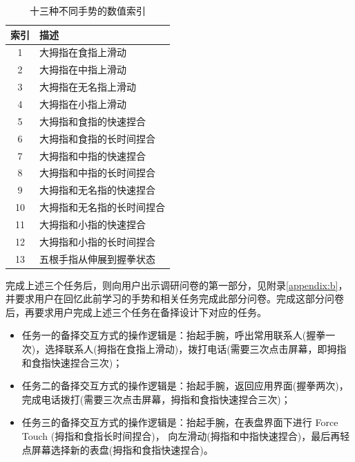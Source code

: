 \begin{table}[H]
    \small
    \kaishu
    \centering
    \begin{tabular}{c l}
        \toprule
        \textbf{索引}        & \textbf{描述} \\
        \hline
        1     & 大拇指在食指上滑动 \\
        2     & 大拇指在中指上滑动 \\
        3     & 大拇指在无名指上滑动 \\
        4     & 大拇指在小指上滑动 \\
        5     & 大拇指和食指的快速捏合 \\
        6     & 大拇指和食指的长时间捏合 \\
        7     & 大拇指和中指的快速捏合 \\
        8     & 大拇指和中指的长时间捏合  \\
        9     & 大拇指和无名指的快速捏合  \\
        10    & 大拇指和无名指的长时间捏合 \\
        11    & 大拇指和小指的快速捏合 \\
        12    & 大拇指和小指的长时间捏合 \\
        13    & 五根手指从伸展到握拳状态 \\
        \bottomrule
    \end{tabular}
    \caption{十三种不同手势的数值索引}
    \label{table:gesture}
\end{table}

完成上述三个任务后，则向用户出示调研问卷的第一部分，见附录\ref{appendix:b}，并要求用户在回忆此前学习的手势和相关任务完成此部分问卷。完成这部分问卷后，再要求用户完成上述三个任务在备择设计下对应的任务。

\begin{itemize}
    \kaishu
    \item 任务一的备择交互方式的操作逻辑是：抬起手腕，呼出常用联系人(握拳一次)，选择联系人(拇指在食指上滑动)，拨打电话(需要三次点击屏幕，即拇指和食指快速捏合三次)；
    \item 任务二的备择交互方式的操作逻辑是：抬起手腕，返回应用界面(握拳两次)，完成电话拨打(需要三次点击屏幕，拇指和食指快速捏合三次)；
    \item 任务三的备择交互方式的操作逻辑是：抬起手腕，在表盘界面下进行 Force Touch (拇指和食指长时间捏合)， 向左滑动(拇指和中指快速捏合)，最后再轻点屏幕选择新的表盘(拇指和食指快速捏合)。
\end{itemize}

